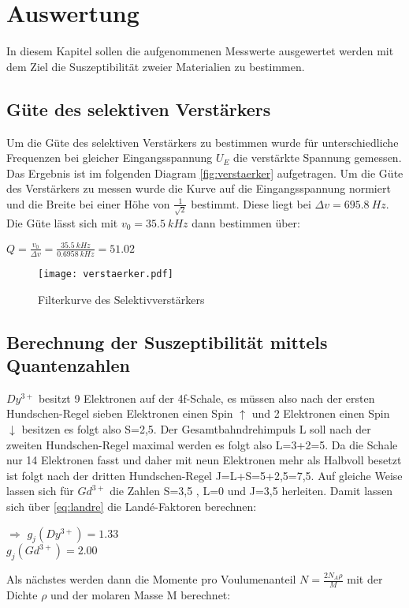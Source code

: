\section{Auswertung}
\label{sec:auswertung}
In diesem Kapitel sollen die aufgenommenen Messwerte ausgewertet werden mit dem Ziel die Suszeptibilität 
zweier Materialien zu bestimmen.
\subsection{Güte des selektiven Verstärkers}
\label{sec:verstaerker}
Um die Güte des selektiven Verstärkers zu bestimmen wurde für unterschiedliche Frequenzen bei gleicher Eingangsspannung 
$U_E$ die verstärkte Spannung gemessen. Das Ergebnis ist im folgenden Diagram \autoref{fig:verstaerker} aufgetragen. 
Um die Güte des Verstärkers zu messen wurde die Kurve auf die Eingangsspannung normiert und die Breite
bei einer Höhe von $\frac{1}{\sqrt{2}}$ bestimmt. Diese liegt bei $\Delta v=\SI[]{695.8}[]{Hz}$. Die Güte lässt sich
mit $v_0=\SI[]{35.5}[]{kHz}$ dann bestimmen über:
\begin{center}
  $Q=\frac{v_0}{\Delta v}=\frac{\SI[]{35.5}[]{kHz}}{\SI[]{0.6958}[]{kHz}}=51.02$
\end{center}
\begin{figure}
    \centering
    \texttt{[image: verstaerker.pdf]}
    \caption{Filterkurve des Selektivverstärkers}
    \label{fig:verstaerker}
  \end{figure}
\newpage
\subsection{Berechnung der Suszeptibilität mittels Quantenzahlen}
\label{sec:quantenzahlen}
$Dy^{3+}$ besitzt 9 Elektronen auf der 4f-Schale, es müssen also nach der ersten Hundschen-Regel sieben 
Elektronen einen Spin $\uparrow$ und 2 Elektronen einen Spin $\downarrow$ besitzen es folgt also S=2,5.
Der Gesamtbahndrehimpuls L soll nach der zweiten Hundschen-Regel maximal werden es folgt also L=3+2=5.
Da die Schale nur 14 Elektronen fasst und daher mit neun Elektronen mehr als Halbvoll besetzt ist folgt 
nach der dritten Hundschen-Regel J=L+S=5+2,5=7,5.
Auf gleiche Weise lassen sich für $Gd^{3+}$ die Zahlen S=3,5 , L=0 und J=3,5 herleiten. 
Damit lassen sich über \autoref{eq:landre} die Landé-Faktoren berechnen:
\begin{center}
    $\Rightarrow$ $g_j(Dy^{3+})=1.33$\\
    $g_j(Gd^{3+})=2.00$
\end{center}
Als nächstes werden dann die Momente pro Voulumenanteil $N=\frac{2N_A\rho}{M}$ mit der Dichte $\rho$ und der
molaren Masse M berechnet:

